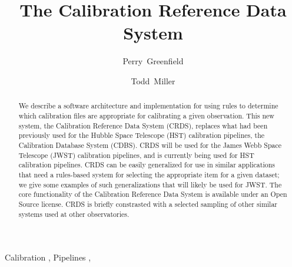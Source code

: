 \documentclass[final,authoryear,5p,times,twocolumn]{elsarticle}
\begin{document}
\begin{frontmatter}



\title{The Calibration Reference Data System}



\author[stsci]{Perry~Greenfield}
\author[stsci]{Todd~Miller}

\address[stsci]{Space Telescope Science Institute, 3700 San Martin Drive, Baltimore, MD 21218, USA}

\begin{abstract}

We describe a software architecture and implementation for using rules to
determine which calibration files are appropriate for calibrating a
given observation. This new system, the Calibration Reference Data System
(CRDS), replaces what had been previously used for
the Hubble Space Telescope (HST) calibration pipelines, 
the Calibration Database System (CDBS). 
CRDS will be used for the James Webb Space
Telescope (JWST) calibration pipelines, and is currently
being used for HST calibration pipelines. CRDS can be
easily generalized for use in similar applications that need a rules-based
system for selecting the appropriate item for a given dataset; we give some
examples of such generalizations that will likely be used for JWST. The core
functionality of the Calibration Reference Data System is available under an
Open Source license. CRDS is briefly constrasted with a selected 
sampling of other similar systems used at other observatories.
\end{abstract}

\begin{keyword}


Calibration \sep
Pipelines \sep

\end{keyword}

\end{frontmatter}
\end{document}
